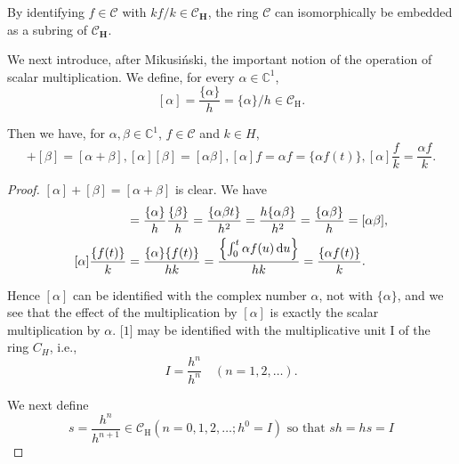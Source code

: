 By identifying $f \in \mathcal{C}$ with $kf / k \in \mathcal{C}_{\mathbf{H}}$, the ring $\mathcal{C}$ can isomorphically be embedded as a subring of $\mathcal{C}_{\mathbf{H}}$. 

We next introduce, after Mikusiński, the important notion of the operation of scalar multiplication. We define, for every $\alpha\in \mathbb{C}^{1}$, 
\begin{equation}\label{eq:VI.6.7}
[ \alpha ] = \frac {\{\alpha \}}{h} = \{\alpha \} / h \in \mathcal {C} _ {\mathrm{H}}.
\end{equation}

Then we have, for $\alpha, \beta \in \mathbb{C}^{1}$, $f \in \mathcal{C}$ and $k \in H$, 
\begin{equation}[ \alpha ] + [ \beta ] = [ \alpha + \beta ], [ \alpha ] [ \beta ] = [ \alpha \beta ], [ \alpha ] f = \alpha f = \{\alpha f (t) \}, [ \alpha ] \frac {f}{k} = \frac {\alpha f}{k}. \label{eq:VI.6.8}\end{equation}

\begin{proof}
 $[\alpha] + [\beta] = [\alpha + \beta]$ is clear. We have 
\begin{align}
[ \alpha ] [ \beta ]& = \frac {\{\alpha \}}{h} \frac {\{\beta \}}{h} = \frac {\{\alpha \beta t \}}{h ^{2}} = \frac {h \{\alpha \beta \}}{h ^{2}} = \frac {\{\alpha \beta \}}{h} = [ \alpha \beta ], \notag \\
[ \alpha ] \frac {\{f (t) \}}{k}& = \frac {\{\alpha \} \{f (t) \}}{h k} = \frac {\left\{\int_{0} ^{t} \alpha f (u) \dd u \right\}}{h k} = \frac {\{\alpha f (t) \}}{k}. \notag
\end{align}

Hence $[\alpha]$ can be identified with the complex number $\alpha$, not with $\{\alpha\}$, and we see that the effect of the multiplication by $[\alpha]$ is exactly the scalar multiplication by $\alpha$. [$1$] may be identified with the multiplicative unit I of the ring $C_{H}$, i.e., 
\begin{equation}\label{eq:VI.6.9}
I = \frac {h ^{n}}{h ^{n}} \quad (n = 1, 2, \dots).
\end{equation}

We next define 
\begin{equation}\label{eq:VI.6.10}
s = \frac {h ^{n}}{h ^{n+1}} \in \mathcal {C} _ {\mathrm{H}} (n = 0, 1, 2, \dots ; h ^{0} = I) \text{ so that } s h = h s = I
\end{equation}
\end{proof}

